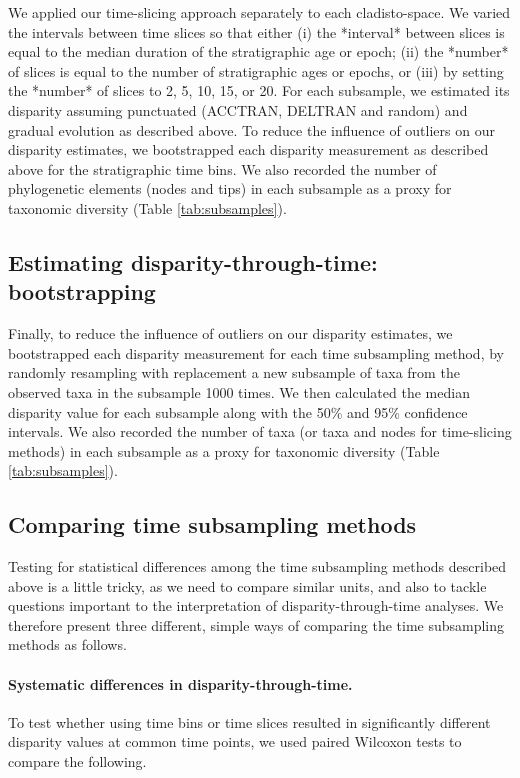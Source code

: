 \documentclass[12pt,a4paper]{article}
\begin{document}
\begin{enumerate}
\begin{enumerate}
We applied our time-slicing approach separately to each cladisto-space.
We varied the intervals between time slices so that either (i) the *interval* between slices is equal to the median duration of the stratigraphic age or epoch; (ii) the *number* of slices is equal to the number of stratigraphic ages or epochs, or (iii) by setting the *number* of slices to 2, 5, 10, 15, or 20.
For each subsample, we estimated its disparity assuming punctuated (ACCTRAN, DELTRAN and random) and gradual evolution as described above. %
To reduce the influence of outliers on our disparity estimates, we bootstrapped each disparity measurement as described above for the stratigraphic time bins. 
We also recorded the number of phylogenetic elements (nodes and tips) in each subsample as a proxy for taxonomic diversity (Table \ref{tab:subsamples}).


\subsection{Estimating disparity-through-time: bootstrapping}
Finally, to reduce the influence of outliers on our disparity estimates, we bootstrapped each disparity measurement for each time subsampling method, by randomly resampling with replacement a new subsample of taxa from the observed taxa in the subsample 1000 times.
We then calculated the median disparity value for each subsample along with the 50\% and 95\% confidence intervals.
We also recorded the number of taxa (or taxa and nodes for time-slicing methods) in each subsample as a proxy for taxonomic diversity (Table \ref{tab:subsamples}).




\subsection{Comparing time subsampling methods}
\label{testing}
Testing for statistical differences among the time subsampling methods described above is a little tricky, as we need to compare similar units, and also to tackle questions important to the interpretation of disparity-through-time analyses. 
We therefore present three different, simple ways of comparing the time subsampling methods as follows.

\paragraph{Systematic differences in disparity-through-time.} 
To test whether using time bins or time slices resulted in significantly different disparity values at common time points, we used paired Wilcoxon tests to compare the following. 


\end{enumerate}
\end{enumerate}
\end{document}
